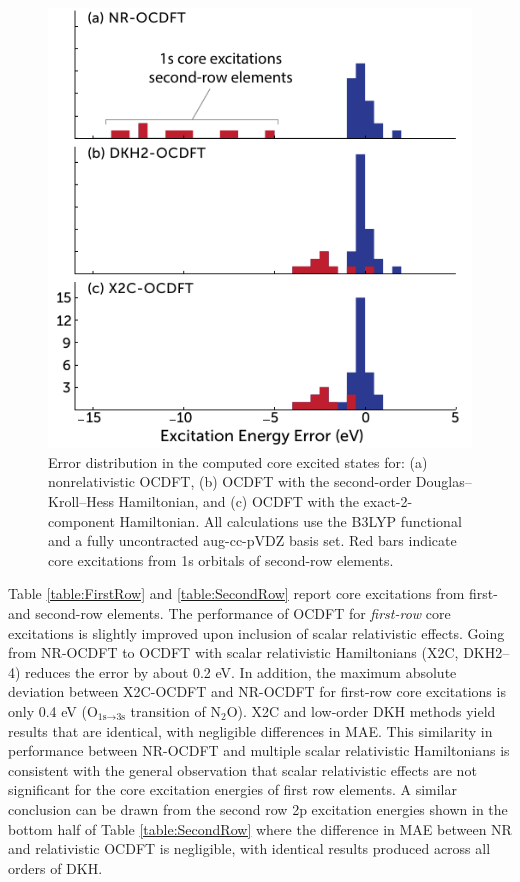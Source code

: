 \documentclass{article}
\begin{document}
 \begin{figure}[!t]
 \includegraphics{figure_3.pdf}
 \caption{Error distribution in the computed core excited states for: (a) nonrelativistic OCDFT, (b) OCDFT with the second-order Douglas--Kroll--Hess Hamiltonian, and (c) OCDFT with the exact-2-component Hamiltonian. All calculations use the B3LYP functional and a fully uncontracted aug-cc-pVDZ basis set.  Red bars indicate core excitations from 1s orbitals of second-row elements.}
 \label{fig:histogram}
 \end{figure}

Table \ref{table:FirstRow} and \ref{table:SecondRow} report core excitations from first- and second-row elements.
The performance of OCDFT for \textit{first-row} core excitations is slightly improved upon inclusion of scalar relativistic effects.
Going from NR-OCDFT to OCDFT with scalar relativistic Hamiltonians (X2C, DKH2--4) reduces the error by about 0.2 eV.
In addition, the maximum absolute deviation between X2C-OCDFT and NR-OCDFT for first-row core excitations is only 0.4 eV (O$_{\text{1s}\rightarrow\text{3s}}$ transition of N$_2$O).
X2C and low-order DKH methods yield results that are identical, with negligible differences in MAE.
This similarity in performance between NR-OCDFT and multiple scalar relativistic Hamiltonians is consistent with the general observation that scalar relativistic effects are not significant for the core excitation energies of first row elements.\cite{Asmuruf2008267,Wallace-OCDFT,Besley-EOM-MOM}  A similar conclusion can be drawn from the second row 2$\text{p}$ excitation energies shown in the bottom half of Table \ref{table:SecondRow} where the difference in MAE between NR and relativistic OCDFT is negligible, with identical results produced across all orders of DKH. 
\end{document}
